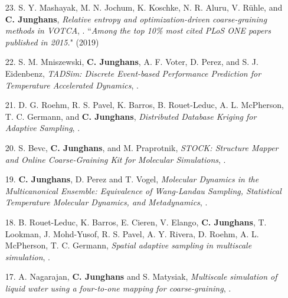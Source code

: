 \documentclass{article}
\begin{document}
\begin{enumerate}
\item[23.] S. Y. Mashayak, M. N. Jochum, K. Koschke, N. R. Aluru, V. R{\"u}hle, and \textbf{C. Junghans},
  \textit{Relative entropy and optimization-driven coarse-graining methods in VOTCA},
  .
   ``\emph{Among the top 10\% most cited PLoS ONE papers published in 2015.}" (2019)

\item[22.] S. M. Mniszewski, \textbf{C. Junghans}, A. F. Voter, D. Perez, and S. J. Eidenbenz,
  \textit{TADSim: Discrete Event-based Performance Prediction for Temperature Accelerated Dynamics},
  .

\item[21.] D. G. Roehm, R. S. Pavel, K. Barros, B. Rouet-Leduc, A. L. McPherson, T. C. Germann, and \textbf{C. Junghans},
  \textit{Distributed Database Kriging for Adaptive Sampling},
  .

\item[20.] S. Bevc, \textbf{C. Junghans}, and M. Praprotnik,
  \textit{STOCK: Structure Mapper and Online Coarse-Graining Kit for Molecular Simulations},
  .

\item[19.] \textbf{C. Junghans}, D. Perez and T. Vogel,
  \textit{Molecular Dynamics in the Multicanonical Ensemble: Equivalence of Wang-Landau Sampling, Statistical Temperature Molecular Dynamics, and Metadynamics},
  .

\item[18.] B. Rouet-Leduc, K. Barros, E. Cieren, V. Elango, \textbf{C. Junghans}, T. Lookman, J. Mohd-Yusof, R. S. Pavel, A. Y. Rivera, D. Roehm, A. L. McPherson, T. C. Germann,
  \textit{Spatial adaptive sampling in multiscale simulation},
  .

\item[17.] A. Nagarajan, \textbf{C. Junghans} and S. Matysiak,
  \textit{Multiscale simulation of liquid water using a four-to-one mapping for coarse-graining},
  .


\end{enumerate}
\end{document}
